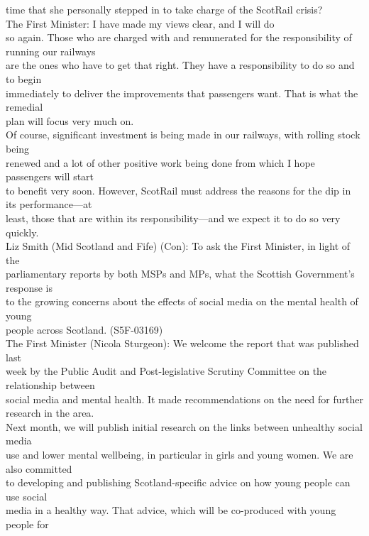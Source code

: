 \documentclass{article}
\begin{document}
\begin{description}
{time that she personally stepped in to take charge of the ScotRail crisis?\\
The First Minister: I have made my views clear, and I will do\\
so again. Those who are charged with and remunerated for the responsibility of running our railways\\
are the ones who have to get that right. They have a responsibility to do so and to begin\\
immediately to deliver the improvements that passengers want. That is what the remedial\\
plan will focus very much on.\\
Of course, significant investment is being made in our railways, with rolling stock being\\
renewed and a lot of other positive work being done from which I hope passengers will start\\
to benefit very soon. However, ScotRail must address the reasons for the dip in its performance—at\\
least, those that are within its responsibility—and we expect it to do so very quickly.\\
Liz Smith (Mid Scotland and Fife) (Con): To ask the First Minister, in light of the\\
parliamentary reports by both MSPs and MPs, what the Scottish Government's response is\\
to the growing concerns about the effects of social media on the mental health of young\\
people across Scotland. (S5F-03169)\\
The First Minister (Nicola Sturgeon): We welcome the report that was published last\\
week by the Public Audit and Post-legislative Scrutiny Committee on the relationship between\\
social media and mental health. It made recommendations on the need for further research in the area.\\
Next month, we will publish initial research on the links between unhealthy social media\\
use and lower mental wellbeing, in particular in girls and young women. We are also committed\\
to developing and publishing Scotland-specific advice on how young people can use social\\
media in a healthy way. That advice, which will be co-produced with young people for\\
}
\end{description}
\end{document}
